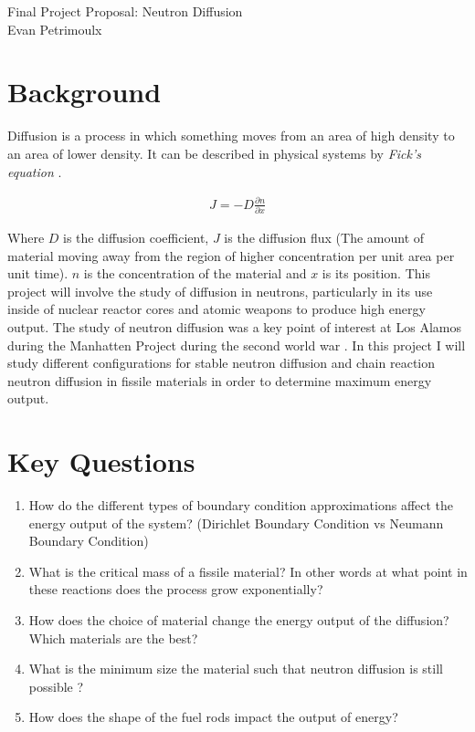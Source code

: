 \documentclass[letterpaper, 12pt]{article}
\begin{document}
    \begin{center}
        {\huge Final Project Proposal: Neutron Diffusion\\}
        \vspace{0.5em}
        Evan Petrimoulx \\
    \end{center}

    \pagestyle{fancy}
    \fancyhf{}
    \fancyhead[R]{\today}
    \fancyfoot[R]{}
    \setlength{\droptitle}{-6em}

    \section*{Background}
         Diffusion is a process in which something moves from an area of high density to an area of lower density. It can be described in physical systems by \textit{Fick's equation} \cite{Nuclear_Power_2021}.

         \begin{align*}
            J = -D \frac{\partial n}{\partial x}
         \end{align*}

         \noindent Where $D$ is the diffusion coefficient, $J$ is the diffusion flux (The amount of material moving away from the region of higher concentration per unit area per unit time). $n$ is the concentration of the material and $x$ is its position. This project will involve the study of diffusion in neutrons, particularly in its use inside of nuclear reactor cores and atomic weapons to produce high energy output. The study of neutron diffusion was a key point of interest at Los Alamos during the Manhatten Project during the second world war \cite{Griffiths_2020}. In this project I will study different configurations for stable neutron diffusion and chain reaction neutron diffusion in fissile materials in order to determine maximum energy output.
    \section*{Key Questions}
         \begin{enumerate}
            \item How do the different types of boundary condition approximations affect the energy output of the system? (Dirichlet Boundary Condition vs Neumann Boundary Condition)
            \item What is the critical mass of a fissile material? In other words at what point in these reactions does the process grow exponentially?
            \item How does the choice of material change the energy output of the diffusion? Which materials are the best?
            \item What is the minimum size the material such that neutron diffusion is still possible \cite{Serber_Rhodes_2020}?
            \item How does the shape of the fuel rods impact the output of energy?
         \end{enumerate}
\end{document}
